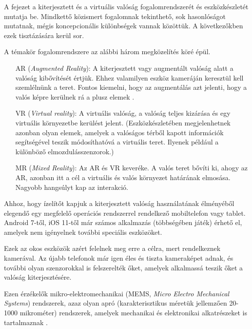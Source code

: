 
A fejezet a kiterjesztett és a virtuális valóság fogalomrendszerét és eszközkészletét mutatja be.
Mindkettő közismert fogalomnak tekinthető, sok hasonlóságot mutatnak, mégis koncepcionális különbségek vannak közöttük.
A következőkben ezek tisztázására kerül sor.


A témakör fogalomrendszere az alábbi három megközelítés köré épül.
\begin{itemize}
\item[AR] (\textit{Augmented Reality}):
A kiterjesztett vagy augmentált valóság alatt a valóság kibővítését értjük. Ehhez valamilyen eszköz kameráján keresztül kell szemlélnünk a teret. Fontos kiemelni, hogy az augmentálás azt jelenti, hogy a valós képre kerülnek rá a plusz elemek \cite{schmalstieg2016augmented}.
\item[VR] (\textit{Virtual reality}): A virtuális valóság, a valóság teljes kizárása és egy virtuális környezetbe kerülést jelent. (Eszközkészletében megjelenhetnek azonban olyan elemek, amelyek a valóságos térből kapott információk segítségével teszik módosíthatóvá a virtuális teret. Ilyenek például a különböző elmozdulásszenzorok.)
\item[MR] (\textit{Mixed Reality}): Az AR és VR keveréke. A valós teret bővíti ki, ahogy az AR, azonban itt a cél a virtuális és valós környezet határának elmosása. Nagyobb hangsúlyt kap az interakció. 
\end{itemize}



Ahhoz, hogy ízelítőt kapjuk a kiterjesztett valóság használatának élményéből elegendő egy megfelelő operációs rendszerrel rendelkező mobiltelefon vagy tablet.
Android 7-től, iOS 11-től már számos alkalmazás (többségében játék) érhető el, amelyek nem igényelnek további speciális eszközöket. 

Ezek az okos eszközök azért felelnek meg erre a célra, mert rendelkeznek kamerával.
Az újabb telefonok már igen éles és tiszta kameraképet adnak, és további olyan szenzorokkal is felszerelték őket, amelyek alkalmassá teszik őket a valóság kiterjesztésére.

Ezen érzékelők  mikro-elektromechanikai (MEMS, \textit{Micro Electro Mechanical Systems}) 
rendszerek, azaz olyan apró (karakterisztikus méretük jellemzően 20-1000 mikrométer) rendszerek, amelyek mechanikai és elektronikai alkatrészeket is tartalmaznak \cite{mems}.


